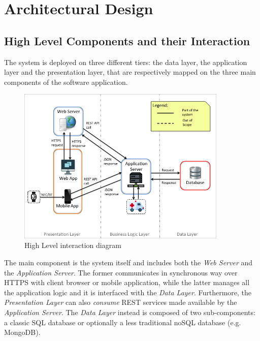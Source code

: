 \documentclass[a4paper]{article}
\begin{document}
\newpage
\section{Architectural Design}
\subsection{High Level Components and their Interaction}
The system is deployed on three different tiers: the data layer, the application layer and the presentation layer, that are respectively mapped on the three main components of the software application.
\begin{figure}[!htpb]
    	\centering
    	\includegraphics[width=100mm,keepaspectratio]{images/highlevel.png}
    	\caption{High Level interaction diagram}
\end{figure}

The main component is the system itself and includes both the \textit{Web Server} and the \textit{Application Server}. The former communicates in synchronous way over HTTPS with client browser or mobile application, while the latter manages all the application logic and it is interfaced with the \textit{Data Layer}. Furthermore, the \textit{Presentation Layer} can also \textit{consume} REST services made available by the \textit{Application Server}. The \textit{Data Layer} instead is composed of two sub-components: a classic SQL database or optionally a less traditional noSQL database (e.g. MongoDB).
\end{document}
